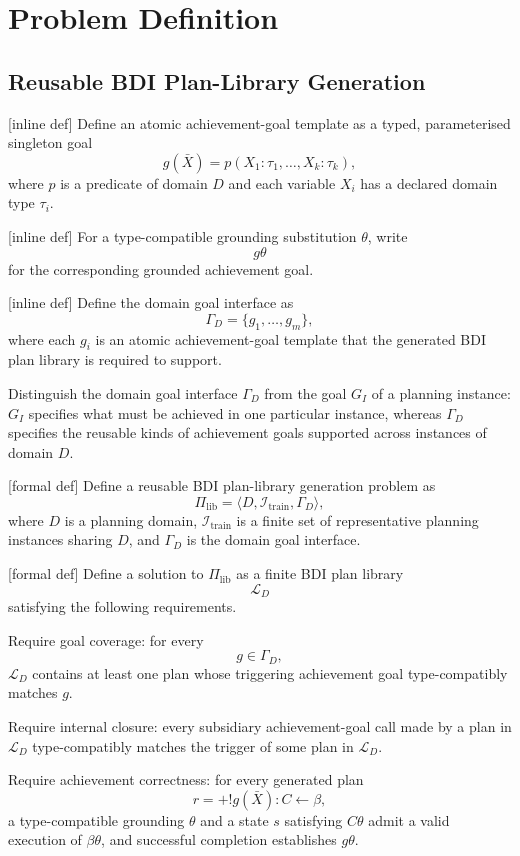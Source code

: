 \section{Problem Definition}

\subsection{Reusable BDI Plan-Library Generation}

[inline def] Define an atomic achievement-goal template as a typed,
parameterised singleton goal
\[
g(\bar{X})
=
p(X_1:\tau_1,\ldots,X_k:\tau_k),
\]
where \(p\) is a predicate of domain \(D\) and each variable \(X_i\)
has a declared domain type \(\tau_i\).

[inline def] For a type-compatible grounding substitution \(\theta\),
write
\[
g\theta
\]
for the corresponding grounded achievement goal.

[inline def] Define the domain goal interface as
\[
\Gamma_D=\{g_1,\ldots,g_m\},
\]
where each \(g_i\) is an atomic achievement-goal template that the
generated BDI plan library is required to support.

Distinguish the domain goal interface \(\Gamma_D\) from the goal \(G_I\)
of a planning instance: \(G_I\) specifies what must be achieved in one
particular instance, whereas \(\Gamma_D\) specifies the reusable kinds
of achievement goals supported across instances of domain \(D\).

[formal def] Define a reusable BDI plan-library generation problem as
\[
\Pi_{\mathrm{lib}}
=
\langle
D,
\mathcal{I}_{\mathrm{train}},
\Gamma_D
\rangle,
\]
where \(D\) is a planning domain,
\(\mathcal{I}_{\mathrm{train}}\) is a finite set of representative
planning instances sharing \(D\), and
\(\Gamma_D\) is the domain goal interface.

[formal def] Define a solution to \(\Pi_{\mathrm{lib}}\) as a finite
BDI plan library
\[
\mathcal{L}_D
\]
satisfying the following requirements.

Require goal coverage: for every
\[
g\in\Gamma_D,
\]
\(\mathcal{L}_D\) contains at least one plan whose triggering
achievement goal type-compatibly matches \(g\).

Require internal closure: every subsidiary achievement-goal call made
by a plan in \(\mathcal{L}_D\) type-compatibly matches the trigger of
some plan in \(\mathcal{L}_D\).

Require achievement correctness: for every generated plan
\[
r=+!g(\bar{X}):C\leftarrow\beta,
\]
a type-compatible grounding \(\theta\) and a state \(s\) satisfying
\(C\theta\) admit a valid execution of \(\beta\theta\), and successful
completion establishes \(g\theta\).

